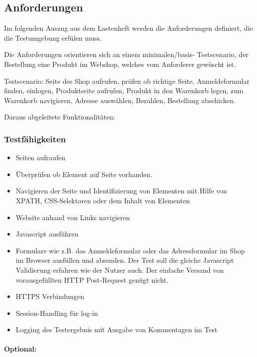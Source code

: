 \subsection{Anforderungen}\label{anforderungen}

Im folgenden Auszug aus dem Lastenheft werden die Anforderungen
definiert, die die Testumgebung erfülen muss.

Die Anforderungen orientieren sich an einem minimalen/basis-
Testscenario, der Bestellung eine Produkt im Webshop, welches vom
Anforderer gewüscht ist.

Testscenario: Seite des Shop aufrufen, prüfen ob richtige Seite,
Anmeldeformular finden, einlogen, Produktseite aufrufen, Produkt in den
Warenkorb legen, zum Warenkorb navigieren, Adresse auswählen, Bezahlen,
Bestellung abschicken.

Daraus abgeleitete Funktionalitäten:

\subsubsection{Testfähigkeiten}\label{testfuxe4higkeiten}

\begin{itemize}
\itemsep1pt\parskip0pt
\item
  Seiten aufraufen
\item
  Überprüfen ob Element auf Seite vorhanden.
\item
  Navigieren der Seite und Identifizierung von Elementen mit Hilfe von
  XPATH, CSS-Selektoren oder dem Inhalt von Elementen
\item
  Website anhand von Links navigieren
\item
  Javascript ausführen
\item
  Formulare wie z.B. das Anmeldeformular oder das Adressformular im Shop
  im Browser ausfüllen und absenden. Der Test soll die gleiche
  Javascript Validierung erfahren wie der Nutzer auch. Der einfache
  Versand von vorausgefüllten HTTP Post-Request genügt nicht.
\item
  HTTPS Verbindungen
\item
  Session-Handling für log-in
\item
  Logging des Testergebnis mit Ausgabe von Kommentagen im Test
\end{itemize}

\paragraph{Optional:}\label{optional}

